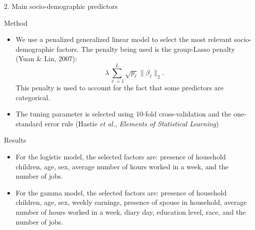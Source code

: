 \documentclass[final]{beamer}
\newcounter{acolumn}%
\def\autoheight{\vspace*{0pt}}%
\begin{document}
\begin{frame}
\begin{acolumns}[t]
\begin{column}{.72\linewidth}
                     
    \end{column}
              
    
    \begin{column}{.24\linewidth}
    \begin{center}
    	\LARGE{2. Main socio-demographic predictors}
    \end{center}
     \begin{block}{Method}
     	\begin{itemize}
     		\item We use a penalized generalized linear model to select the most relevant socio-demographic factors. The penalty being used is the group-Lasso penalty (Yuan \& Lin, 2007):
     		$$\lambda \sum_{\ell=1}^{L}\sqrt{p_\ell}\|\beta_\ell\|_2.$$
     		This penalty is used to account for the fact that some predictors are categorical.
     		\item The tuning parameter is selected using 10-fold cross-validation and the one-standard error rule (Hastie \emph{et al.}, \emph{Elements of Statistical Learning})
     	\end{itemize}
        
                     
     \end{block}
          
          
     \begin{block}{Results}
        \begin{itemize}
        	\item For the logistic model, the selected factors are: presence of household children, age, sex, average number of hours worked in a week, and the number of jobs.
        	
        	\item For the gamma model, the selected factors are: presence of household children, age, sex, weekly earnings, presence of spouse in household, average number of hours worked in a week, diary day, education level, race, and the number of jobs.
        \end{itemize}
       \autoheight                   
     \end{block}
     
        
    \end{column}
    
    
    \end{acolumns}
    
    \vfill
    
        \begin{acolumns}[t]
        

\end{acolumns}
\end{frame}
\end{document}
